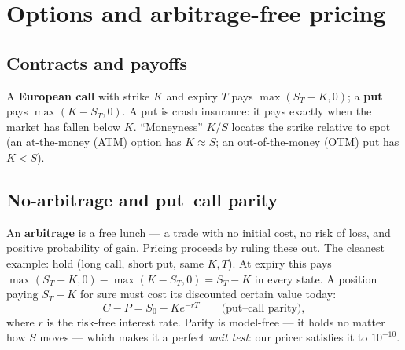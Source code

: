 \documentclass[11pt,a4paper]{article}
\begin{document}
\section{Options and arbitrage-free pricing}
\label{sec:options}

\subsection{Contracts and payoffs}
A \textbf{European call} with strike $K$ and expiry $T$ pays
$\max(S_T-K,0)$; a \textbf{put} pays $\max(K-S_T,0)$. A put is crash
insurance: it pays exactly when the market has fallen below $K$. ``Moneyness''
$K/S$ locates the strike relative to spot (an at-the-money (ATM) option has
$K\approx S$; an out-of-the-money (OTM) put has $K<S$).

\subsection{No-arbitrage and put--call parity}
An \textbf{arbitrage} is a free lunch --- a trade with no initial cost, no risk
of loss, and positive probability of gain. Pricing proceeds by ruling these
out. The cleanest example: hold (long call, short put, same $K,T$). At expiry
this pays $\max(S_T-K,0)-\max(K-S_T,0)=S_T-K$ in every state. A position paying
$S_T-K$ for sure must cost its discounted certain value today:
\begin{equation}
C-P=S_0-Ke^{-rT}
\qquad\text{(put--call parity)},
\label{eq:parity}
\end{equation}
where $r$ is the risk-free interest rate. Parity is model-free --- it holds no
matter how $S$ moves --- which makes it a perfect \emph{unit test}: our pricer
satisfies it to $10^{-10}$.
\end{document}
